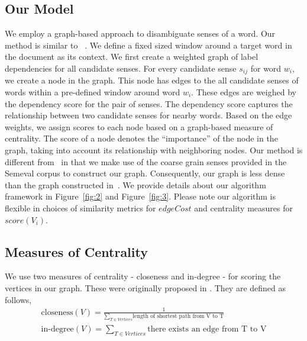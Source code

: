 \documentclass[12pt,letterpaper]{article}
\newcommand{\blue}[1]{\textcolor{RoyalBlue}{#1}}
\newcommand{\instructions}[1]{\blue{\textit{#1}}}
\begin{document}
\subsection{Our Model}
\label{sec:proposed-models}
We employ a graph-based approach to disambiguate senses of a word. Our method is similar to ~\cite{Sinha}. We define a fixed sized window around a target word in the document as its context. We first create a weighted graph of label dependencies for all candidate senses. For every candidate sense $s_{ij}$ for word $w_i$, we create a node in the graph. This node has edges to the all candidate senses of words within a pre-defined window around word $w_i$. These edges are weighed by the dependency score for the pair of senses. The dependency score captures the relationship between two candidate senses for nearby words. Based on the edge weights, we assign scores to each node based on a graph-based measure of centrality. The score of a node denotes the ``importance'' of the node in the graph, taking into account its relationship with neighboring nodes.
Our method is different from~\cite{Sinha} in that we make use of the coarse grain senses provided in the Semeval corpus to construct our graph. Consequently, our graph is less dense than the graph constructed in~\cite{Sinha}.
We provide details about our algorithm framework in Figure~\ref{fig:2} and Figure~\ref{fig:3}. Please note our algorithm is flexible in choices of similarity metrics for $edgeCost$ and centrality measures for $score(V_i)$.

\subsection{Measures of Centrality}
We use two measures of centrality - closeness and in-degree - for scoring the vertices in our graph. These were originally proposed in \cite{Sinha}. They are defined as follows, \\
\begin{align*} 
\text{closeness}(V)= \frac{1}{\sum\limits_{T \in Vertices}{\text{length of shortest path from V to T}}} \\
\text{in-degree}(V)= \sum\limits_{T \in Vertices} \text{there exists an edge from T to V} \\
\end{align*}
\end{document}
